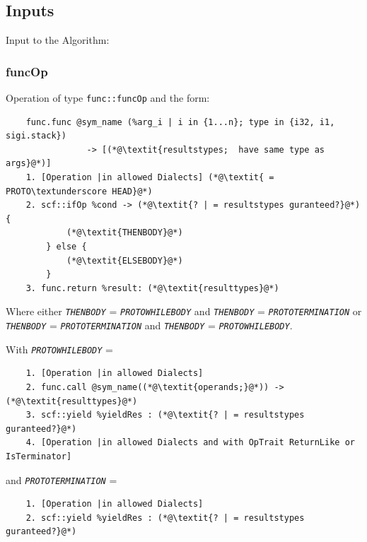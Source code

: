 \documentclass{article}
\begin{document}
\subsection[short]{Inputs}

Input to the Algorithm: \newline 
\subsubsection{funcOp}
 Operation of type \texttt{func::funcOp} and the form:
\begin{lstlisting}
    func.func @sym_name (%arg_i | i in {1...n}; type in {i32, i1, sigi.stack})
                -> [(*@\textit{resultstypes;  have same type as args}@*)]
    1. [Operation |in allowed Dialects] (*@\textit{ = PROTO\textunderscore HEAD}@*)
    2. scf::ifOp %cond -> (*@\textit{? | = resultstypes guranteed?}@*) {
            (*@\textit{THENBODY}@*)
        } else {
            (*@\textit{ELSEBODY}@*)
        }
    3. func.return %result: (*@\textit{resulttypes}@*)
\end{lstlisting}
Where either \newline 
\texttt{\textit{THENBODY}} = \texttt{\textit{PROTO\textunderscore WHILEBODY}} 
and \texttt{\textit{THENBODY}} = \texttt{\textit{PROTO\textunderscore TERMINATION}} \newline  or 
\texttt{\textit{THENBODY}} = \texttt{\textit{PROTO\textunderscore TERMINATION}}
and \texttt{\textit{THENBODY}} = \texttt{\textit{PROTO\textunderscore WHILEBODY}}. \newline

With \texttt{\textit{PROTO\textunderscore WHILEBODY}} = 
\begin{lstlisting}
    1. [Operation |in allowed Dialects]
    2. func.call @sym_name((*@\textit{operands;}@*)) -> (*@\textit{resulttypes}@*)
    3. scf::yield %yieldRes : (*@\textit{? | = resultstypes guranteed?}@*)
    4. [Operation |in allowed Dialects and with OpTrait ReturnLike or IsTerminator]
\end{lstlisting}
and \texttt{\textit{PROTO\textunderscore TERMINATION}} = 
\begin{lstlisting}
    1. [Operation |in allowed Dialects]
    2. scf::yield %yieldRes : (*@\textit{? | = resultstypes guranteed?}@*)
\end{lstlisting}
\end{document}
